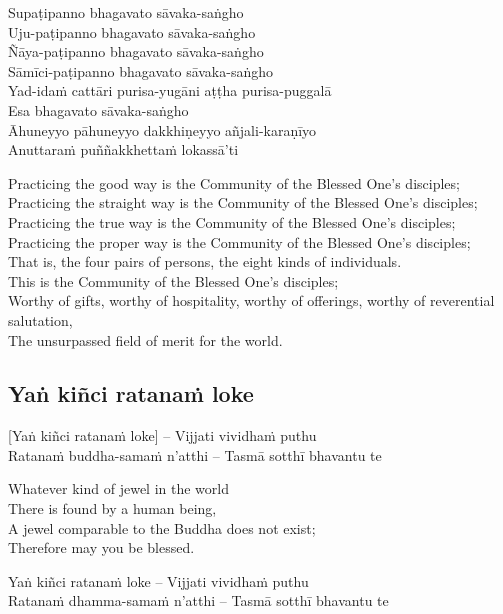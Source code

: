 Supaṭipanno bhagavato sāvaka-saṅgho\\
Uju-paṭipanno bhagavato sāvaka-saṅgho\\
Ñāya-paṭipanno bhagavato sāvaka-saṅgho\\
Sāmīci-paṭipanno bhagavato sāvaka-saṅgho\\
Yad-idaṁ cattāri purisa-yugāni aṭṭha purisa-puggalā\\
Esa bhagavato sāvaka-saṅgho\\
Āhuneyyo pāhuneyyo dakkhiṇeyyo añjali-karaṇīyo\\
Anuttaraṁ puññakkhettaṁ lokassā’ti

\begin{english}
  Practicing the good way is the Community of the Blessed One’s disciples;\\
  Practicing the straight way is the Community of the Blessed One’s disciples;\\
  Practicing the true way is the Community of the Blessed One’s disciples;\\
  Practicing the proper way is the Community of the Blessed One’s disciples;\\
  That is, the four pairs of persons, the eight kinds of individuals.\\
  This is the Community of the Blessed One’s disciples;\\
  Worthy of gifts, worthy of hospitality, worthy of offerings, worthy of reverential salutation,\\
  The unsurpassed field of merit for the world.
\end{english}

\suttaRef{[SN 11.3]}

\subsection{Yaṅ kiñci ratanaṁ loke}
\label{yan-kinci-ratanam-loke}
[Yaṅ kiñci ratanaṁ loke] – Vijjati vividhaṁ puthu\\
Ratanaṁ buddha-samaṁ n’atthi – Tasmā sotthī bhavantu te

\begin{english}
  Whatever kind of jewel in the world\\
  There is found by a human being,\\
  A jewel comparable to the Buddha does not exist;\\
  Therefore may you be blessed.
\end{english}

Yaṅ kiñci ratanaṁ loke – Vijjati vividhaṁ puthu\\
Ratanaṁ dhamma-samaṁ n’atthi – Tasmā sotthī bhavantu te

